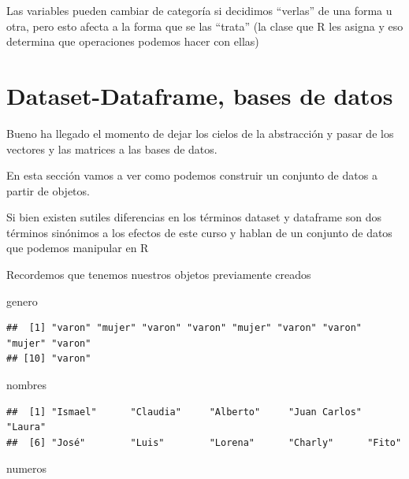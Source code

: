 \documentclass[
]{book}
\newenvironment{Shaded}{\begin{snugshade}}{\end{snugshade}}
\newcommand{\NormalTok}[1]{#1}
\begin{document}
Las variables pueden cambiar de categoría si decidimos ``verlas'' de una forma u otra, pero esto afecta a la forma que se las ``trata'' (la clase que R les asigna y eso determina que operaciones podemos hacer con ellas)

\hypertarget{dataset-dataframe-bases-de-datos}{%
\section{Dataset-Dataframe, bases de datos}\label{dataset-dataframe-bases-de-datos}}

Bueno ha llegado el momento de dejar los cielos de la abstracción y pasar de los vectores y las matrices a las bases de datos.

En esta sección vamos a ver como podemos construir un conjunto de datos a partir de objetos.

Si bien existen sutiles diferencias en los términos dataset y dataframe son dos términos sinónimos a los efectos de este curso y hablan de un conjunto de datos que podemos manipular en R

Recordemos que tenemos nuestros objetos previamente creados

\begin{Shaded}
\begin{Highlighting}[]
\NormalTok{genero}
\end{Highlighting}
\end{Shaded}

\begin{verbatim}
##  [1] "varon" "mujer" "varon" "varon" "mujer" "varon" "varon" "mujer" "varon"
## [10] "varon"
\end{verbatim}

\begin{Shaded}
\begin{Highlighting}[]
\NormalTok{nombres}
\end{Highlighting}
\end{Shaded}

\begin{verbatim}
##  [1] "Ismael"      "Claudia"     "Alberto"     "Juan Carlos" "Laura"      
##  [6] "José"        "Luis"        "Lorena"      "Charly"      "Fito"
\end{verbatim}

\begin{Shaded}
\begin{Highlighting}[]
\NormalTok{numeros}
\end{Highlighting}
\end{Shaded}
\end{document}
